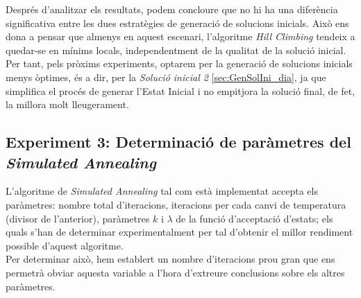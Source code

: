 \documentclass[a4paper]{article}
\begin{document}
	Després d'analitzar els resultats, podem concloure que no hi ha una diferència significativa entre les dues estratègies de generació de solucions inicials. Això ens dona a pensar que almenys en aquest escenari, l'algoritme \textit{Hill Climbing} tendeix a quedar-se en mínims locals, independentment de la qualitat de la solució inicial. Per tant, pels pròxims experiments, optarem per la generació de solucions inicials menys òptimes, és a dir, per la \textit{Solució inicial 2} \ref{sec:GenSolIni_dia}, ja que simplifica el procés de generar l'Estat Inicial i no empitjora la solució final, de fet, la millora molt lleugerament.
	
	\subsection{Experiment 3: Determinació de paràmetres del \textit{Simulated Annealing}}
	\label{sec:exp3}

	L'algoritme de \textit{Simulated Annealing} tal com està implementat accepta els paràmetres: nombre total d'iteracions, iteracions per cada canvi de temperatura (divisor de l'anterior), paràmetres $k$ i $\lambda$ de la funció d'acceptació d'estats; els quals s'han de determinar experimentalment per tal d'obtenir el millor rendiment possible d'aquest algoritme.\\
	
	Per determinar això, hem establert un nombre d'iteracions prou gran que ens permetrà obviar aquesta variable a l'hora d'extreure conclusions sobre els altres paràmetres.
\end{document}

